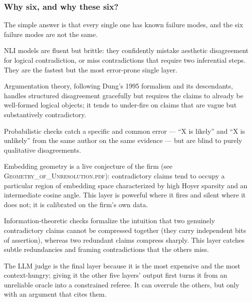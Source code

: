 \documentclass[11pt]{article}
\begin{document}
\subsubsection{Why six, and why these six?}

The simple answer is that every single one has known failure modes, and the six failure modes are not the same.

NLI models are fluent but brittle: they confidently mistake aesthetic disagreement for logical contradiction, or miss contradictions that require two inferential steps. They are the fastest but the most error-prone single layer.

Argumentation theory, following Dung's 1995 formalism and its descendants, handles structured disagreement gracefully but requires the claims to already be well-formed logical objects; it tends to under-fire on claims that are vague but substantively contradictory.

Probabilistic checks catch a specific and common error --- ``X is likely'' and ``X is unlikely'' from the same author on the same evidence --- but are blind to purely qualitative disagreements.

Embedding geometry is a live conjecture of the firm (see \textsc{Geometry\_of\_Unresolution.pdf}): contradictory claims tend to occupy a particular region of embedding space characterized by high Hoyer sparsity and an intermediate cosine angle. This layer is powerful where it fires and silent where it does not; it is calibrated on the firm's own data.

Information-theoretic checks formalize the intuition that two genuinely contradictory claims cannot be compressed together (they carry independent bits of assertion), whereas two redundant claims compress sharply. This layer catches subtle redundancies and framing contradictions that the others miss.

The LLM judge is the final layer because it is the most expensive and the most context-hungry; giving it the other five layers' output first turns it from an unreliable oracle into a constrained referee. It can overrule the others, but only with an argument that cites them.
\end{document}
